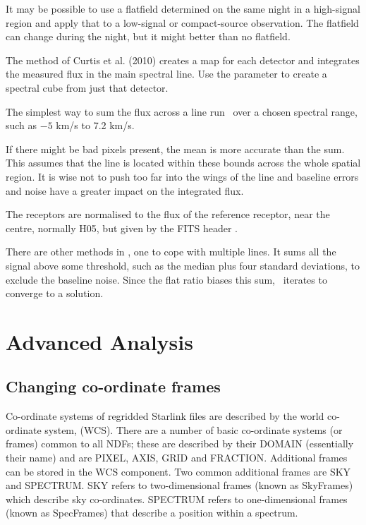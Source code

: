 \documentclass[11pt,oneside,chapters]{starlink}
\begin{document}
It may be possible to use a flatfield determined on the same night
in a high-signal region and apply that to a low-signal or
compact-source observation.  The flatfield can change during the
night, but it might better than no flatfield.

The method of Curtis et al. (2010)\cite{flat} creates a map for each detector
and integrates the measured flux in the main spectral line.  Use the
 parameter to create a spectral cube from just that
detector.

\begin{terminalv}
\end{terminalv}

The simplest way to sum the flux across a line run \stats\ over a chosen
spectral range, such as $-5$ km/s to 7.2 km/s.

\begin{terminalv}
\end{terminalv}

If there might be bad pixels present, the mean is more accurate than the sum.
This assumes that the line is located within these bounds across the whole
spatial region.  It is wise not to push too far into the wings of the line and
baseline errors and noise have a greater impact on the integrated flux.

The receptors are normalised to the flux of the reference receptor,
near the centre, normally H05, but given by the FITS header .


There are other methods in \oracdr, one to cope with multiple lines.
It sums all the signal above some threshold, such as the median plus four
standard deviations, to exclude the baseline noise.  Since the flat
ratio biases this sum, \oracdr\ iterates to converge to a solution.

\clearpage
\chapter{Advanced Analysis}
\label{sec:advanced}

\section{Changing co-ordinate frames}

Co-ordinate systems of regridded Starlink files are described by the
world co-ordinate system, (WCS). There are a number of basic co-ordinate
systems (or frames) common to all NDFs; these are described by their
DOMAIN (essentially their name) and are PIXEL, AXIS, GRID and
FRACTION. Additional frames can be stored in the WCS component. Two
common additional frames are SKY and SPECTRUM. SKY refers to
two-dimensional frames (known as SkyFrames) which describe sky
co-ordinates. SPECTRUM refers to one-dimensional frames (known as
SpecFrames) that describe a position within a spectrum.
\end{document}
